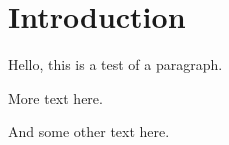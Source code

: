 \chapter{Introduction}
Hello, this is a test of a paragraph.

\newpar
More text here.

And some other text here.